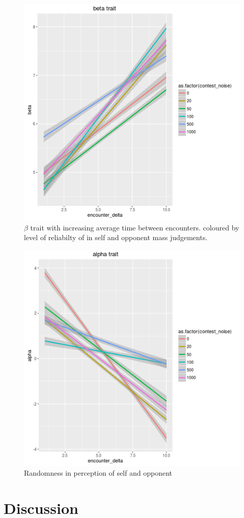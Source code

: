 \documentclass[a4paper,11pt]{article}
\begin{document}
\begin{figure}
  \includegraphics[width=\textwidth]{figures/beta_plot.png}
  \caption{$\beta$ trait with increasing average time between encounters. coloured by level of
  reliabilty of in self and opponent mass judgements. }
\end{figure}

\begin{figure}
  \includegraphics[width=\textwidth]{figures/alpha_plot.png}
  \caption{Randomness in perception of self and opponent}
\end{figure}


\section{Discussion}

\begin{center} %
    
\end{center}
\clearpage

\end{document}
